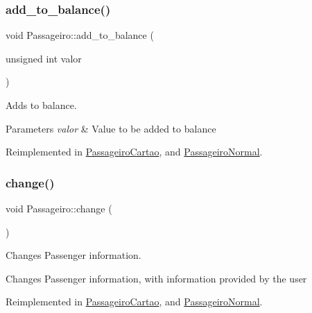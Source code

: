 \subsubsection{\texorpdfstring{add\+\_\+to\+\_\+balance()}{add\_to\_balance()}}
{\footnotesize\ttfamily void Passageiro\+::add\+\_\+to\+\_\+balance (\begin{DoxyParamCaption}\item[{unsigned int}]{valor }\end{DoxyParamCaption})\hspace{0.3cm}{\ttfamily [virtual]}}



Adds to balance. 


\begin{DoxyParams}{Parameters}
{\em valor} & Value to be added to balance \\
\hline
\end{DoxyParams}


Reimplemented in \hyperlink{class_passageiro_cartao_ac1c2a6ef96d46ffd0a37e757d1e605a1}{Passageiro\+Cartao}, and \hyperlink{class_passageiro_normal_a8761222e6cd84eb8185507a591845a46}{Passageiro\+Normal}.

\mbox{\label{class_passageiro_acfec9100c1a2a5b7cdf218f2eb4ea62e}} 
\subsubsection{\texorpdfstring{change()}{change()}}
{\footnotesize\ttfamily void Passageiro\+::change (\begin{DoxyParamCaption}{ }\end{DoxyParamCaption})\hspace{0.3cm}{\ttfamily [virtual]}}



Changes Passenger information. 

Changes Passenger information, with information provided by the user 

Reimplemented in \hyperlink{class_passageiro_cartao_af1e3f1909d80c783301eaece5926dc47}{Passageiro\+Cartao}, and \hyperlink{class_passageiro_normal_a0e8bb38b9a15acff1b8e2ab1b2fb2dfe}{Passageiro\+Normal}.

\mbox{\label{class_passageiro_aa38cf36a9d750417fc0b83781886a852}} 
